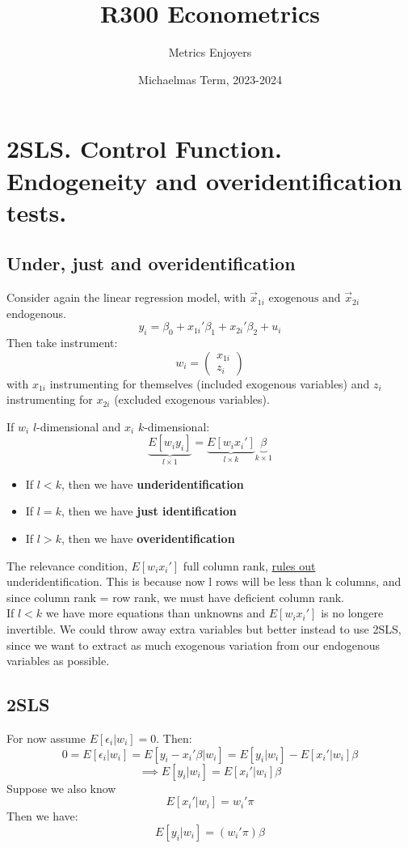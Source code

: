 \documentclass[DIV=14,titlepage=false]{scrreprt}
\title{%
R300 Econometrics}
\author{Metrics Enjoyers}
\date{Michaelmas Term, 2023-2024}
\begin{document}
\chapter{2SLS. Control Function. Endogeneity and overidentification tests.}

\section{Under, just and overidentification}

Consider again the linear regression model, with \(\vec x_{1i} \text{ exogenous and } \vec x_{2i}\) endogenous.
\[y_i = \beta_0 + x_{1i}'\beta_1 + x_{2i}'\beta_2 + u_i\]
Then take instrument:
\[w_i=\begin{pmatrix}x_{1i} \\ z_i\end{pmatrix}\]
with \(x_{1i}\) instrumenting for themselves (included exogenous variables) and \(z_i\) instrumenting for \(x_{2i}\) (excluded exogenous variables). 

If \(w_i\) \(l\)-dimensional and \(x_i\) \(k\)-dimensional:
\[\underbrace{E[w_iy_i]}_{l\times 1} = \underbrace{E[w_ix_i']}_{l\times k}\underbrace{\beta}_{k\times 1}\]
\begin{itemize}
\item If \(l<k\), then we have \textbf{underidentification}
\item If \(l=k\), then we have \textbf{just identification}
\item If \(l>k\), then we have \textbf{overidentification}
\end{itemize} 

The relevance condition, \(E[w_ix_i']\) full column rank, \underline{rules out} underidentification. This is because now l rows will be less than k columns, and since column rank = row rank, we must have deficient column rank.
\\ If \(l<k\) we have more equations than unknowns and \(E[w_ix_i']\) is no longere invertible. We could throw away extra variables but better instead to use 2SLS, since we want to extract as much exogenous variation from our endogenous variables as possible.

\section{2SLS}

For now assume \(E[\epsilon_i|w_i]=0\). Then:
\[0=E[\epsilon_i|w_i]=E[y_i-x_i'\beta|w_i]=E[y_i|w_i]-E[x_i'|w_i]\beta\]
\[\implies E[y_i|w_i]=E[x_i'|w_i]\beta\]
Suppose we also know
\[E[x_i'|w_i]=w_i'\pi\]
Then we have:
\[E[y_i|w_i]=(w_i'\pi)\beta\]
\end{document}
